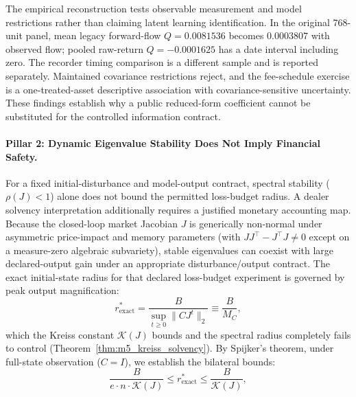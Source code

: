 \documentclass[12pt]{article}
\theoremstyle{definition}
\theoremstyle{remark}
\begin{document}
The empirical reconstruction tests observable measurement and model restrictions rather than claiming latent learning identification. In the original 768-unit panel, mean legacy forward-flow $Q=0.0081536$ becomes $0.0003807$ with observed flow; pooled raw-return $Q=-0.0001625$ has a date interval including zero. The recorder timing comparison is a different sample and is reported separately. Maintained covariance restrictions reject, and the fee-schedule exercise is a one-treated-asset descriptive association with covariance-sensitive uncertainty. These findings establish why a public reduced-form coefficient cannot be substituted for the controlled information contract.

\paragraph{Pillar 2: Dynamic Eigenvalue Stability Does Not Imply Financial Safety.}
For a fixed initial-disturbance and model-output contract, spectral stability ($\rho(J)<1$) alone does not bound the permitted loss-budget radius. A dealer solvency interpretation additionally requires a justified monetary accounting map. Because the closed-loop market Jacobian $J$ is generically non-normal under asymmetric price-impact and memory parameters (with $J J^\top - J^\top J \neq 0$ except on a measure-zero algebraic subvariety), stable eigenvalues can coexist with large declared-output gain under an appropriate disturbance/output contract. The exact initial-state radius for that declared loss-budget experiment is governed by peak output magnification:
\begin{equation}
r^*_{\text{exact}} = \frac{B}{\sup_{t \ge 0} \|C J^t\|_2} \equiv \frac{B}{M_C},
\end{equation}
which the Kreiss constant $\mathcal{K}(J)$ bounds and the spectral radius completely fails to control (Theorem~\ref{thm:m5_kreiss_solvency}). By Spijker's theorem, under full-state observation ($C = I$), we establish the bilateral bounds:
\begin{equation}
\frac{B}{e \cdot n \cdot \mathcal{K}(J)} \le r^*_{\text{exact}} \le \frac{B}{\mathcal{K}(J)},
\end{equation}
\end{document}
